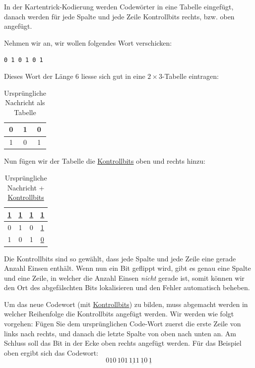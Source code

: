 \begin{mydefinition}[Kartentrick]\label{def:kartentrick}
	In der Kartentrick-Kodierung werden Codewörter in eine Tabelle eingefügt, danach werden für jede Spalte und jede Zeile Kontrollbits rechts, bzw. oben angefügt.

	Nehmen wir an, wir wollen folgendes Wort verschicken:

	\texttt{0 1 0 1 0 1}

	Dieses Wort der Länge 6 liesse sich gut in eine \(2\times3\)-Tabelle eintragen:

	\begin{table}[H]
		\centering
		\begin{tabular}{c|c|c}
			0 & 1 & 0 \\\midrule
			1 & 0 & 1 \\
		\end{tabular}
		\caption{Ursprüngliche Nachricht als Tabelle}
		\label{tab:ex-zauberer}
	\end{table}

	Nun fügen wir der Tabelle die \underline{Kontrollbits} oben und rechts hinzu:
	\begin{table}[H]
		\centering
		\begin{tabular}{c|c|c||c}
			\underline{1} & \underline{1} & \underline{1} & \underline{1} \\\midrule\midrule
			0             & 1             & 0             & \underline{1} \\\midrule
			1             & 0             & 1             & \underline{0} \\
		\end{tabular}
		\caption{Ursprüngliche Nachricht + \underline{Kontrollbits}}
		\label{tab:ex-zauberer-parity}
	\end{table}

	Die Kontrollbits sind so gewählt, dass jede Spalte und jede Zeile eine gerade Anzahl Einsen enthält. Wenn nun ein Bit geflippt wird, gibt es genau eine Spalte und eine Zeile, in welcher die Anzahl Einsen \textit{nicht} gerade ist, somit können wir den Ort des abgefälschten Bits lokalisieren und den Fehler automatisch beheben.

	Um das neue Codewort (mit \underline{Kontrollbits}) zu bilden, muss abgemacht werden in welcher Reihenfolge die Kontrollbits angefügt werden. Wir werden wie folgt vorgehen: Fügen Sie dem ursprünglichen Code-Wort zuerst die erste Zeile von links nach rechts, und danach die letzte Spalte von oben nach unten an. Am Schluss soll das Bit in der Ecke oben rechts angefügt werden. Für das Beispiel oben ergibt sich das Codewort:
	\[010\, 101\, \underbar{111}\, \underbar{10}\, \underline{1}\]

\end{mydefinition}


